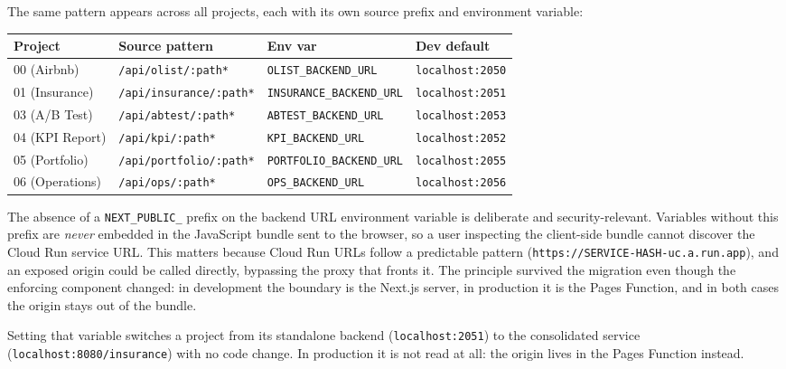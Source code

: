 The same pattern appears across all projects, each with its own source prefix and environment variable:

\begin{center}
\begin{tabular}{llll}
\toprule
\textbf{Project} & \textbf{Source pattern} & \textbf{Env var} & \textbf{Dev default} \\
\midrule
00 (Airbnb) & \texttt{/api/olist/:path*} & \texttt{OLIST\_BACKEND\_URL} & \texttt{localhost:2050} \\
01 (Insurance) & \texttt{/api/insurance/:path*} & \texttt{INSURANCE\_BACKEND\_URL} & \texttt{localhost:2051} \\
03 (A/B Test) & \texttt{/api/abtest/:path*} & \texttt{ABTEST\_BACKEND\_URL} & \texttt{localhost:2053} \\
04 (KPI Report) & \texttt{/api/kpi/:path*} & \texttt{KPI\_BACKEND\_URL} & \texttt{localhost:2052} \\
05 (Portfolio) & \texttt{/api/portfolio/:path*} & \texttt{PORTFOLIO\_BACKEND\_URL} & \texttt{localhost:2055} \\
06 (Operations) & \texttt{/api/ops/:path*} & \texttt{OPS\_BACKEND\_URL} & \texttt{localhost:2056} \\
\bottomrule
\end{tabular}
\end{center}

\begin{keyinsight}
The absence of a \texttt{NEXT\_PUBLIC\_} prefix on the backend URL environment variable is deliberate and security-relevant. Variables without this prefix are \emph{never} embedded in the JavaScript bundle sent to the browser, so a user inspecting the client-side bundle cannot discover the Cloud Run service URL. This matters because Cloud Run URLs follow a predictable pattern (\texttt{https://SERVICE-HASH-uc.a.run.app}), and an exposed origin could be called directly, bypassing the proxy that fronts it. The principle survived the migration even though the enforcing component changed: in development the boundary is the Next.js server, in production it is the Pages Function, and in both cases the origin stays out of the bundle.
\end{keyinsight}

Setting that variable switches a project from its standalone backend
(\texttt{localhost:2051}) to the consolidated service
(\texttt{localhost:8080/insurance}) with no code change. In production it is not
read at all: the origin lives in the Pages Function instead.

